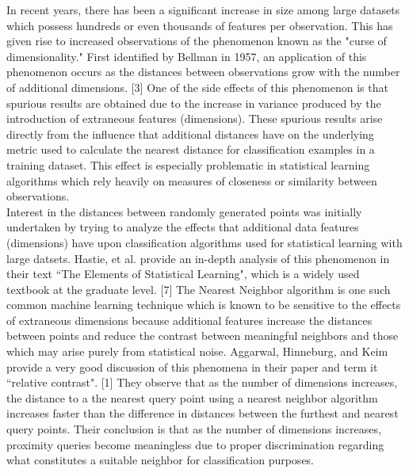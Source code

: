 \documentclass[11pt]{article} %
\begin{document}
    In recent years, there has been a significant increase in size among large datasets which possess hundreds or even thousands of features per observation.  This has given rise to increased observations of the phenomenon known as the "curse of dimensionality." First identified by Bellman in 1957, an application of this phenomenon occurs as the distances between observations grow with the number of additional dimensions. [3]  One of the side effects of this phenomenon is that spurious results are obtained due to the increase in variance produced by the introduction of extraneous features (dimensions).  These spurious results arise directly from the influence that additional distances have on the underlying metric used to calculate the nearest distance for classification examples in a training dataset.  This effect is especially problematic in statistical learning algorithms which rely heavily on measures of closeness or similarity between observations. \\
\indent
    Interest in the distances between randomly generated points was initially undertaken by trying to analyze the effects that additional data features (dimensions) have upon classification algorithms used for statistical learning with large datsets.  Hastie, et al. provide an in-depth analysis of this phenomenon in their text ``The Elements of Statistical Learning", which is a widely used textbook at the graduate level. [7]  The Nearest Neighbor algorithm is one such common machine learning technique which is known to be sensitive to the effects of extraneous dimensions because additional features increase the distances between points and reduce the contrast between meaningful neighbors and those which may arise purely from statistical noise.  Aggarwal, Hinneburg, and Keim provide a very good discussion of this phenomena in their paper and term it ``relative contrast". [1]  They observe that as the number of dimensions increases, the distance to a the nearest query point using a nearest neighbor algorithm increases faster than the difference in distances between the furthest and nearest query points.  Their conclusion is that as the number of dimensions increases, proximity queries become meaningless due to proper discrimination regarding what constitutes a suitable neighbor for classification purposes. \\
\indent    
\end{document}
